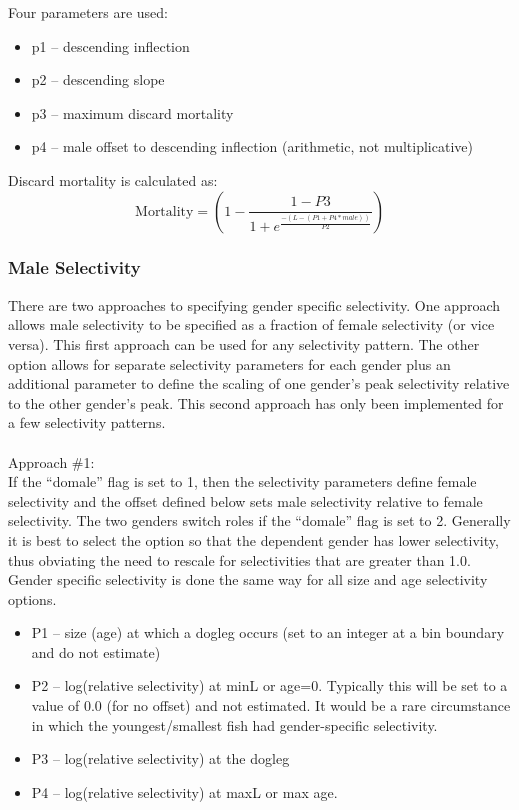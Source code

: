 Four parameters are used:
\begin{itemize}
	\item p1 – descending inflection
	\item p2 – descending slope
	\item p3 – maximum discard mortality
	\item p4 – male offset to descending inflection (arithmetic, not multiplicative)
\end{itemize}

Discard mortality is calculated as:
\begin{equation}
	\text{Mortality} = \left(1 - \frac{1-P3}{1+e^{\frac{-(L-(P1+P4*male))}{P2}}}\right)
\end{equation}

\subsubsection{Male Selectivity}
There are two approaches to specifying gender specific selectivity.  One approach allows male selectivity to be specified as a fraction of female selectivity (or vice versa).  This first approach can be used for any selectivity pattern.  The other option allows for separate selectivity parameters for each gender plus an additional parameter to define the scaling of one gender’s peak selectivity relative to the other gender’s peak.  This second approach has only been implemented for a few selectivity patterns.\\
\\
Approach \#1:\\
If the “domale” flag is set to 1, then the selectivity parameters define female selectivity and the offset defined below sets male selectivity relative to female selectivity.  The two genders switch roles if the “domale” flag is set to 2.  Generally it is best to select the option so that the dependent gender has lower selectivity, thus obviating the need to rescale for selectivities that are greater than 1.0.  Gender specific selectivity is done the same way for all size and age selectivity options.
\begin{itemize}
	\item P1 – size (age) at which a dogleg occurs (set to an integer at a bin boundary and do not estimate)
	\item P2 – log(relative selectivity) at minL or age=0.  Typically this will be set to a value of 0.0 (for no offset) and not estimated.  It would be a rare circumstance in which the youngest/smallest fish had gender-specific selectivity.
	\item P3 – log(relative selectivity) at the dogleg
	\item P4 – log(relative selectivity) at maxL or max age.
\end{itemize}

